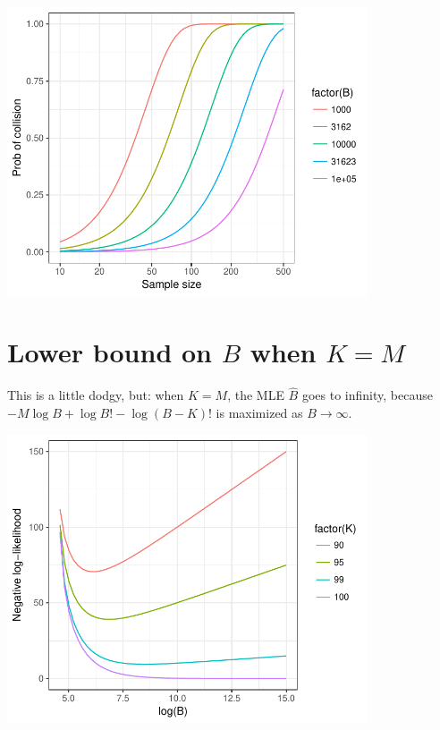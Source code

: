 \documentclass{article}\usepackage[]{graphicx}\usepackage[]{color}
\newenvironment{knitrout}{}{} %
\begin{document}
\begin{knitrout}
\color{fgcolor}
\includegraphics[width=0.8\textwidth]{figure/collision_approx-1} 

\end{knitrout}


\section{Lower bound on $B$ when $K=M$}

This is a little dodgy, but: when $K=M$, the MLE $\hat B$
goes to infinity, because $-M \log B + \log B! - \log (B-K)!$
is maximized as $B \to \infty$.

\begin{knitrout}
\color{fgcolor}
\includegraphics[width=0.8\textwidth]{figure/lplot1-1} 

\end{knitrout}
\end{document}
